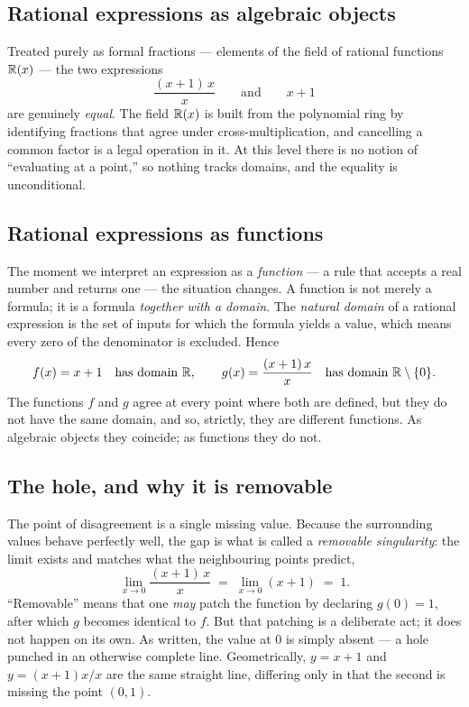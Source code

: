 \documentclass{essay}
\begin{document}
\subsection{Rational expressions as algebraic objects}

Treated purely as formal fractions --- elements of the field of rational functions
$\mathbb{R}(x)$ --- the two expressions
\[
  \frac{(x+1)\,x}{x} \qquad\text{and}\qquad x+1
\]
are genuinely \emph{equal}. The field $\mathbb{R}(x)$ is built from the polynomial ring by
identifying fractions that agree under cross-multiplication, and cancelling a common factor
is a legal operation in it. At this level there is no notion of ``evaluating at a point,''
so nothing tracks domains, and the equality is unconditional.

\subsection{Rational expressions as functions}

The moment we interpret an expression as a \emph{function} --- a rule that accepts a real
number and returns one --- the situation changes. A function is not merely a formula; it is
a formula \emph{together with a domain}. The \emph{natural domain} of a rational expression
is the set of inputs for which the formula yields a value, which means every zero of the
denominator is excluded. Hence
\[
  f(x) = x+1 \quad\text{has domain } \mathbb{R},
  \qquad
  g(x) = \frac{(x+1)\,x}{x} \quad\text{has domain } \mathbb{R}\setminus\{0\}.
\]
The functions $f$ and $g$ agree at every point where both are defined, but they do not have
the same domain, and so, strictly, they are different functions. As algebraic objects they
coincide; as functions they do not.

\subsection{The hole, and why it is removable}

The point of disagreement is a single missing value. Because the surrounding values behave
perfectly well, the gap is what is called a \emph{removable singularity}: the limit exists
and matches what the neighbouring points predict,
\[
  \lim_{x \to 0} \frac{(x+1)\,x}{x} \;=\; \lim_{x \to 0}(x+1) \;=\; 1.
\]
``Removable'' means that one \emph{may} patch the function by declaring $g(0) = 1$, after
which $g$ becomes identical to $f$. But that patching is a deliberate act; it does not
happen on its own. As written, the value at $0$ is simply absent --- a hole punched in an
otherwise complete line. Geometrically, $y = x+1$ and $y = (x+1)x/x$ are the same straight
line, differing only in that the second is missing the point $(0,1)$.
\end{document}
